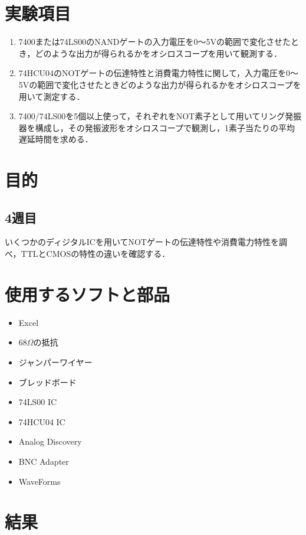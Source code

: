 \documentclass{jlreq}
\numberwithin{equation}{section}
\begin{document}
\tableofcontents
\clearpage

\section{実験項目}
\begin{enumerate}
  \item 7400または74LS00のNANDゲートの入力電圧を0～5Vの範囲で変化させたとき，どのような出力が得られるかをオシロスコープを用いて観測する．
  \item 74HCU04のNOTゲートの伝達特性と消費電力特性に関して，入力電圧を0～5Vの範囲で変化させたときどのような出力が得られるかをオシロスコープを用いて測定する．
  \item 7400/74LS00を5個以上使って，それぞれをNOT素子として用いてリング発振器を構成し，その発振波形をオシロスコープで観測し，1素子当たりの平均遅延時間を求める．
\end{enumerate}

\section{目的}
\subsection{4週目}
いくつかのディジタルICを用いてNOTゲートの伝達特性や消費電力特性を調べ，TTLとCMOSの特性の違いを確認する．

\section{使用するソフトと部品}
\begin{itemize}
  \item Excel
  \item $68\si{\Omega}$の抵抗
  \item ジャンパーワイヤー
  \item ブレッドボード
  \item 74LS00 IC
  \item 74HCU04 IC
  \item Analog Discovery
  \item BNC Adapter
  \item WaveForms
\end{itemize}

\section{結果}
\end{document}
